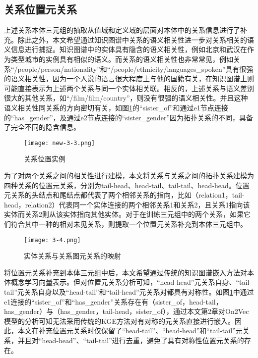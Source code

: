 \subsection{关系位置元关系}
上述关系本体三元组的抽取从值域和定义域的层面对本体中的关系信息进行了补充。除此之外，本文希望通过知识图谱中关系的语义相关性进一步对关系相关的语义信息进行捕捉。知识图谱中的实体具有隐含的语义相关性，例如北京和武汉在作为类型城市的实例具有相似的语义。而关系的语义相关性也非常常见，例如关系“/people/person/nationality”和“/people/ethnicity/languages\_spoken”具有很强的语义相关性，因为一个人说的语言很大程度上与他的国籍有关，在知识图谱上则可能直接表示为上述两个关系与同一个实体相关联。相反的，上述关系与语义差别很大的其他关系，如“/film/film/country”，则没有很强的语义相关性。并且这种语义相关性同关系的方向密切有关，如图\ref{fig:new-3-3}的“sister\_of”和通过e1节点连接的“has\_gender”，及通过e2节点连接的“sister\_gender”因为拓扑关系的不同，具备了完全不同的隐含信息。
\begin{figure}[h]
  \centering
  \texttt{[image: new-3-3.png]}
  \caption{关系位置实例}
  \label{fig:new-3-3}
\end{figure}

为了对两个关系之间的相关性进行建模，本文将关系与关系之间的拓扑关系建模为四种关系的位置元关系，分别为tail-head、head-tail、tail-tail、head-head。位置元关系的头结点和尾结点都代表了两个相邻关系的指向，比如（relation1，tail-head，relation2）代表同一个实体连接的两个相邻关系1和关系2，且关系1指向该实体而关系2则从该实体指向其他实体。对于在训练三元组中的两个关系，如果它们符合其中一种的相对未见关系，则提取一个位置元关系补充到本体三元组中。
\begin{figure}[h]
  \centering
  \texttt{[image: 3-4.png]}
  \caption{实体关系与关系图元关系的映射}
  \label{fig:3-4}
\end{figure}

将位置元关系补充到本体三元组中后，本文希望通过传统的知识图谱嵌入方法对本体概念学习向量表示。但对位置元关系分析可知，“head-head”元关系自身、“tail-tail”元关系自身以及“head-tail”和“tail-head”元关系对都具有对称性。如图\ref{fig:new-3-3}中通过e1连接的“sister\_of”和“has\_gender”关系存在有（sister\_of，head-tail，has\_gender）与（has\_gender，tail-head，sister\_of），通过本文第2章对On2Vec模型的分析可知无法采用传统的KGE方法对有对称的元关系直接进行嵌入。因此，本文在补充位置元关系时仅保留了“head-tail”、“head-head”和“tail-tail”元关系，并且对“head-head”、“tail-tail”进行去重，避免了具有对称性位置元关系的存在。

